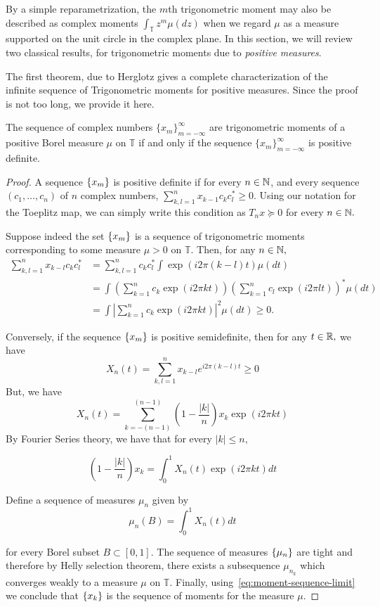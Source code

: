 By a simple reparametrization, the $m$th trigonometric moment may also be
described as complex moments $\int_\mathbb{T} z^m \mu(dz)$ when we regard $\mu$
as a measure supported on the unit circle in the complex plane. In this section,
we will review two classical results, for trigonometric moments due to \emph{positive measures}.

The first theorem, due to Herglotz gives a complete characterization of the
infinite sequence of Trigonometric moments for positive measures. Since the proof is not too long, we provide it here.
\begin{theorem}\label{thm:herglotz}
	The sequence of complex numbers $\{x_m\}_{m=-\infty}^{\infty}$ are
trigonometric moments of a positive Borel measure $\mu$ on $\mathbb{T}$ if and
only if the sequence $\{x_m\}_{m=-\infty}^{\infty}$ is positive definite.
\end{theorem}
\begin{proof}

A sequence $\left\{ x_m \right\}$ is positive definite if for every $n \in \mathbb{N}$, and every
sequence $(c_1, \ldots, c_n)$ of $n$ complex numbers, $\sum_{k,l=1}^n x_{k-1}
c_k c_l^* \geq 0.$ Using our notation for the Toeplitz map, we can simply write
this condition as $T_n x \succeq 0$ for every $n \in \mathbb{N}.$

Suppose indeed the set $\left\{ x_m \right\}$ is a sequence of trigonometric moments
corresponding to some measure $\mu > 0$ on $\mathbb{T}.$ Then, for any $n \in
\mathbb{N},$
\begin{align*}
	\sum_{k,l=1}^n x_{k-l} c_k c_l^* &= \sum_{k,l=1}^n c_k c_l^* \int \exp(i 2 \pi (k-l) t ) \mu (dt)\\
	&= \int \left(\sum_{k=1}^n c_k \exp(i 2 \pi k t) \right) \left(\sum_{k=1}^n c_l \exp(i 2 \pi l t) \right)^* \mu (dt) \\
	&= \int \left|\sum_{k=1}^n c_k \exp(i 2 \pi k t) \right|^2 \mu (dt) \geq 0.
\end{align*}

Conversely, if the sequence $\left\{ x_m \right\}$ is positive semidefinite, then for any $t \in \mathbb{R},$  we have
\[
X_n(t) = \sum_{k,l=1}^n x_{k-l} e^{i 2 \pi (k-l) t} \geq 0
\]
But, we have
\[
	X_n(t) = \sum_{k=-(n-1)}^{(n-1)} \left( 1 - \frac{|k|}{n}\right) x_k \exp(i 2\pi k t)
\]
By Fourier Series theory, we have that for every $|k| \leq n,$

\begin{equation}
	\label{eq:moment-sequence-limit}
	\left( 1 - \frac{|k|}{n} \right) x_k = \int_0^1 X_n(t) \exp(i 2\pi k t ) d t
\end{equation}

Define a sequence of measures $\mu_n$ given by
\[
	\mu_n(B) = \int_0^1 X_n(t) d t
\]

for every Borel subset $B \subset [0,1].$ The sequence of measures $\left\{ \mu_n \right\}$
are tight and therefore by Helly selection theorem, there exists a subsequence
$\mu_{n_k}$ which converges weakly to a measure $\mu$ on $\mathbb{T}.$ Finally, using~\ref{eq:moment-sequence-limit} we conclude that $\left\{ x_k \right\}$ is the sequence of moments for the measure $\mu.$
\end{proof}

